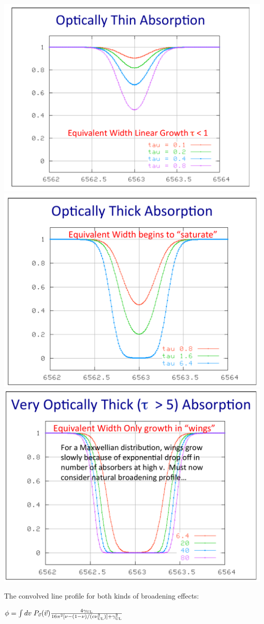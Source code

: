         \includegraphics[scale=.5]{thin.png}
        \includegraphics[scale=.5]{thick.png}
        \includegraphics[scale=.5]{very_thick.png}

        The convolved line profile for both kinds of broadening effects:
        
        $ \phi = \int dv \; P_{\Vec{v}}(\Vec{v}) \frac{4 \gamma_{\rm UL}}{16 \pi^2 [\nu - (1-\nu) / (c \nu_{\rm UL}^2) ] + \gamma_{\rm UL}^2}$
